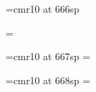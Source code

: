 \newcount\instance

\newwrite\out

\newcount\wheelmodulus
{} %
\font\wheelcogids=cmr10 at 666sp
%
%
%
%


%
%
%
\fontdimen\wheelmodulus\wheelcogids=\z@
%
%
%
%


\font\wheelcognext=cmr10 at 667sp
\fontdimen\wheelmodulus\wheelcognext=\z@

\font\wheelcogdeltas=cmr10 at 668sp
\fontdimen\wheelmodulus\wheelcogdeltas=\z@

